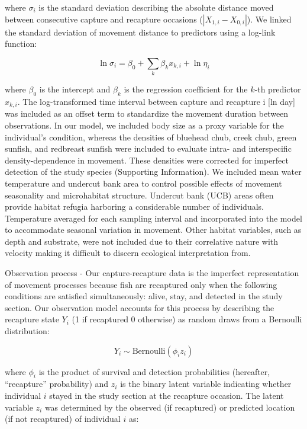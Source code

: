 \documentclass[11pt, class=article, crop=false]{standalone}
\begin{document}
where $\sigma_i$ is the standard deviation describing the absolute distance moved between consecutive capture and recapture occasions ($|X_{1,i} - X_{0,i}|$).
We linked the standard deviation of  movement distance to predictors using a log-link function: 

\begin{equation}
    \ln \sigma_i = \beta_0 + \sum_{k} \beta_k x_{k,i} + \ln \eta_i
    \label{eq:linear-pred}
\end{equation}

where $\beta_0$ is the intercept and $\beta_k$ is the regression coefficient for the $k$-th predictor $x_{k,i}$. The log-transformed time interval between capture and recapture i [ln day] was included as an offset term to standardize the movement duration between observations. In our model, we included body size as a proxy variable for the individual’s condition, whereas the densities of bluehead chub, creek chub, green sunfish, and redbreast sunfish were included to evaluate intra- and interspecific density-dependence in movement. These densities were corrected for imperfect detection of the study species (Supporting Information). We included mean water temperature and undercut bank area to control possible effects of movement seasonality and microhabitat structure. Undercut bank (UCB) areas often provide habitat refugia harboring a considerable number of individuals. Temperature averaged for each sampling interval and incorporated into the model to accommodate seasonal variation in movement. Other habitat variables, such as depth and substrate, were not included due to their correlative nature with velocity making it difficult to discern ecological interpretation from. 

Observation process - Our capture-recapture data is the imperfect representation of movement processes because fish are recaptured only when the following conditions are satisfied simultaneously: alive, stay, and detected in the study section. Our observation model accounts for this process by describing the recapture state $Y_i$ (1 if recaptured 0 otherwise) as random draws from a Bernoulli distribution:

\begin{equation}
    Y_i \sim \text{Bernoulli}(\phi_i z_i)
\end{equation}

where $\phi_i$ is the product of survival and detection probabilities (hereafter, ``recapture'' probability) and $z_i$ is the binary latent variable indicating whether individual $i$ stayed in the study section at the recapture occasion.
The latent variable $z_i$ was determined by the observed (if recaptured) or predicted location (if not recaptured) of individual $i$ as: 
\end{document}
